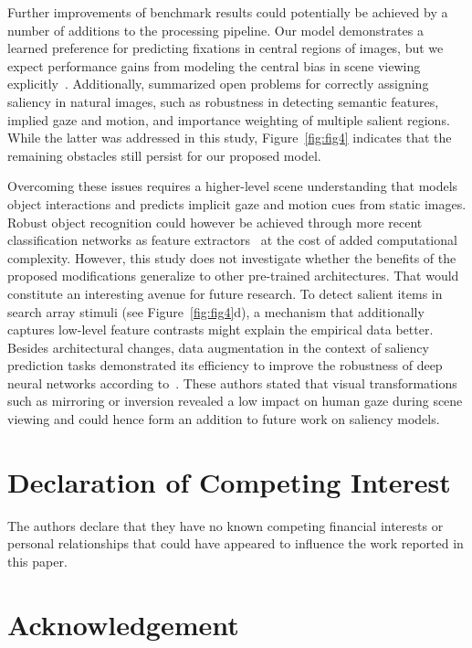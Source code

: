 \documentclass[final,1p,times,number]{elsarticle}
\begin{document}
Further improvements of benchmark results could potentially be achieved by a number of additions to the processing pipeline. Our model demonstrates a learned preference for predicting fixations in central regions of images, but we expect performance gains from modeling the central bias in scene viewing explicitly~\cite{kummerer2014deep,kummerer2016deepgaze,cornia2016deep,Cornia2018PredictingHE,kruthiventi2017deepfix}. Additionally, \citet{bylinskii2015saliency} summarized open problems for correctly assigning saliency in natural images, such as robustness in detecting semantic features, implied gaze and motion, and importance weighting of multiple salient regions. While the latter was addressed in this study, Figure~\ref{fig:fig4} indicates that the remaining obstacles still persist for our proposed model.

Overcoming these issues requires a higher-level scene understanding that models object interactions and predicts implicit gaze and motion cues from static images. Robust object recognition could however be achieved through more recent classification networks as feature extractors~\cite{oyama2018influence} at the cost of added computational complexity. However, this study does not investigate whether the benefits of the proposed modifications generalize to other pre-trained architectures. That would constitute an interesting avenue for future research. To detect salient items in search array stimuli (see Figure~\ref{fig:fig4}d), a mechanism that additionally captures low-level feature contrasts might explain the empirical data better. Besides architectural changes, data augmentation in the context of saliency prediction tasks demonstrated its efficiency to improve the robustness of deep neural networks according to~\citet{che2018invariance}. These authors stated that visual transformations such as mirroring or inversion revealed a low impact on human gaze during scene viewing and could hence form an addition to future work on saliency models.

\section*{Declaration of Competing Interest}

The authors declare that they have no known competing financial interests or personal relationships that could have appeared to influence the work reported in this paper.

\section*{Acknowledgement}
\end{document}
